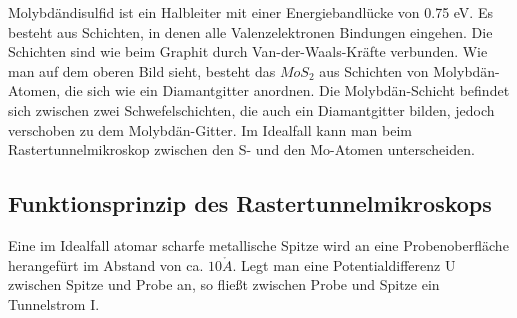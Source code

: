 Molybdändisulfid ist ein Halbleiter mit einer Energiebandlücke von 0.75 eV. Es besteht aus Schichten, in denen alle Valenzelektronen Bindungen eingehen. Die Schichten sind wie beim Graphit durch Van-der-Waals-Kräfte verbunden. Wie man auf dem oberen Bild sieht, besteht das $MoS_2$ aus Schichten von Molybdän-Atomen, die sich wie ein Diamantgitter anordnen. Die Molybdän-Schicht befindet sich zwischen zwei Schwefelschichten, die auch ein Diamantgitter bilden, jedoch verschoben zu dem Molybdän-Gitter. Im Idealfall kann man beim Rastertunnelmikroskop zwischen den S- und den Mo-Atomen unterscheiden.

\subsection{Funktionsprinzip des Rastertunnelmikroskops}

Eine im Idealfall atomar scharfe metallische Spitze wird an eine Probenoberfläche herangefürt im Abstand von ca. $10 \mathring A$. Legt man eine Potentialdifferenz U zwischen Spitze und Probe an, so fließt zwischen Probe und Spitze ein Tunnelstrom I.



































